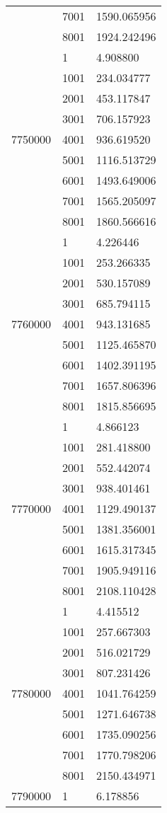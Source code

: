 \begin{table}[htb!]
\begin{tabular}{lll}
 & 7001 & 1590.065956 \\
 & 8001 & 1924.242496 \\
\multirow[c]{9}{*}{7750000} & 1 & 4.908800 \\
 & 1001 & 234.034777 \\
 & 2001 & 453.117847 \\
 & 3001 & 706.157923 \\
 & 4001 & 936.619520 \\
 & 5001 & 1116.513729 \\
 & 6001 & 1493.649006 \\
 & 7001 & 1565.205097 \\
 & 8001 & 1860.566616 \\
\multirow[c]{9}{*}{7760000} & 1 & 4.226446 \\
 & 1001 & 253.266335 \\
 & 2001 & 530.157089 \\
 & 3001 & 685.794115 \\
 & 4001 & 943.131685 \\
 & 5001 & 1125.465870 \\
 & 6001 & 1402.391195 \\
 & 7001 & 1657.806396 \\
 & 8001 & 1815.856695 \\
\multirow[c]{9}{*}{7770000} & 1 & 4.866123 \\
 & 1001 & 281.418800 \\
 & 2001 & 552.442074 \\
 & 3001 & 938.401461 \\
 & 4001 & 1129.490137 \\
 & 5001 & 1381.356001 \\
 & 6001 & 1615.317345 \\
 & 7001 & 1905.949116 \\
 & 8001 & 2108.110428 \\
\multirow[c]{9}{*}{7780000} & 1 & 4.415512 \\
 & 1001 & 257.667303 \\
 & 2001 & 516.021729 \\
 & 3001 & 807.231426 \\
 & 4001 & 1041.764259 \\
 & 5001 & 1271.646738 \\
 & 6001 & 1735.090256 \\
 & 7001 & 1770.798206 \\
 & 8001 & 2150.434971 \\
\multirow[c]{9}{*}{7790000} & 1 & 6.178856 \\

\end{tabular}
\end{table}
